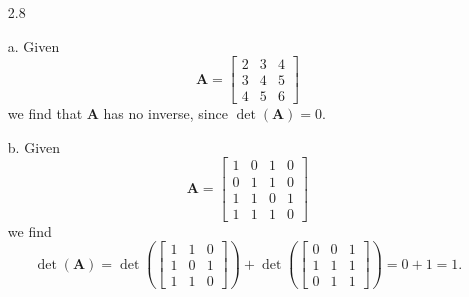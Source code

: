 \documentclass[11pt]{article}
\newcommand{\mat}[1]{\mathbf{#1}}   %
\newcommand{\args}[1]{\!\left(#1\right)}                 %
\theoremstyle{definition}
\theoremstyle{plain}
\theoremstyle{remark}
\begin{document}
\begin{enumerate}
    \item[2.8]

    \item[a.]
          Given
          \[
              \mat{A} =
              \begin{bmatrix}
                  2 & 3 & 4 \\
                  3 & 4 & 5 \\
                  4 & 5 & 6
              \end{bmatrix}
          \]
          we find that $\mat{A}$ has no inverse, since $\det(\mat{A}) = 0$.

    \item[b.]
          Given
          \[
              \mat{A} =
              \begin{bmatrix}
                  1 & 0 & 1 & 0 \\
                  0 & 1 & 1 & 0 \\
                  1 & 1 & 0 & 1 \\
                  1 & 1 & 1 & 0
              \end{bmatrix}
          \]
          we find
          \[
              \det(\mat{A}) = \det \args{
                  \begin{bmatrix}
                      1 & 1 & 0 \\
                      1 & 0 & 1 \\
                      1 & 1 & 0
                  \end{bmatrix}
              }
              + \det \args{
                  \begin{bmatrix}
                      0 & 0 & 1 \\
                      1 & 1 & 1 \\
                      0 & 1 & 1
                  \end{bmatrix}
              }
              = 0 + 1
              = 1.
          \]


\end{enumerate}
\end{document}
